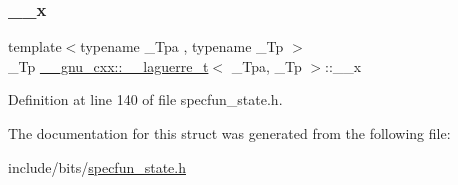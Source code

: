 \subsubsection{\texorpdfstring{\+\_\+\+\_\+x}{\_\_x}}
{\footnotesize\ttfamily template$<$typename \+\_\+\+Tpa , typename \+\_\+\+Tp $>$ \\
\+\_\+\+Tp \hyperlink{struct____gnu__cxx_1_1____laguerre__t}{\+\_\+\+\_\+gnu\+\_\+cxx\+::\+\_\+\+\_\+laguerre\+\_\+t}$<$ \+\_\+\+Tpa, \+\_\+\+Tp $>$\+::\+\_\+\+\_\+x}



Definition at line 140 of file specfun\+\_\+state.\+h.



The documentation for this struct was generated from the following file\+:\begin{DoxyCompactItemize}
\item 
include/bits/\hyperlink{specfun__state_8h}{specfun\+\_\+state.\+h}\end{DoxyCompactItemize}
